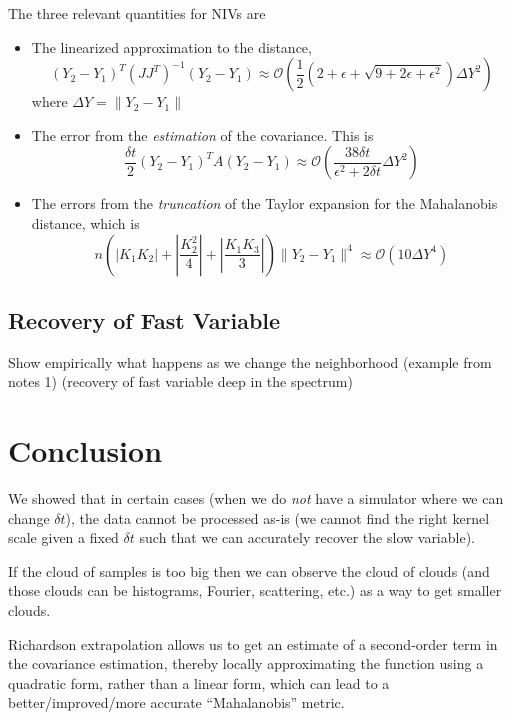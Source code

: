 \documentclass[1p]{elsarticle}
\begin{document}
The three relevant quantities for NIVs are 
\begin{itemize}
\item The linearized approximation to the distance,
%
\begin{equation}
(Y_2 - Y_1)^T (JJ^T)^{-1} (Y_2 - Y_1) 
\approx \mathcal{O} \left(  \frac{1}{2} \left( 2 + \epsilon + \sqrt{ 9 + 2 \epsilon + \epsilon^2}\right) \Delta Y^2\right) 
\end{equation}
where $\Delta Y =  \|Y_2 - Y_1\|$

\item The error from the {\em estimation} of the covariance.
%
This is
\begin{equation}
\frac{\delta t}{2} (Y_2 - Y_1)^T A (Y_2 - Y_1) \approx \mathcal{O} \left( \frac{38 \delta t}{\epsilon ^2 + 2 \delta t}\Delta Y^2 \right)
\end{equation}

\item The errors from the {\em truncation} of the Taylor expansion for the Mahalanobis distance, which is 
\begin{equation}
n \left( \left| K_1 K_2 \right| + \left| \frac{ K_2^2}{4} \right|  + \left| \frac{K_1 K_3}{3} \right|  \right) \| Y_2 - Y_1 \| ^4 \approx \mathcal{O} \left( 10 \Delta Y^4  \right) 
\end{equation}

\end{itemize}

\subsection{Recovery of Fast Variable}

Show empirically what happens as we change the neighborhood (example from notes 1) (recovery of fast variable deep in the spectrum)

\section{Conclusion}

We showed that in certain cases (when we do {\em not} have a simulator where we can change $\delta t$), the data cannot be processed as-is (we cannot find the right kernel scale given a fixed $\delta t$ such that we can accurately recover the slow variable). 

If the cloud of samples is too big then we can observe the cloud of clouds (and those clouds can be histograms, Fourier, scattering, etc.) as a way to get smaller clouds. 


Richardson extrapolation allows us to get an estimate of a second-order term in the covariance estimation, thereby locally approximating the function using a quadratic form, rather than a linear form,  which can lead to a better/improved/more accurate ``Mahalanobis'' metric. 
\end{document}
